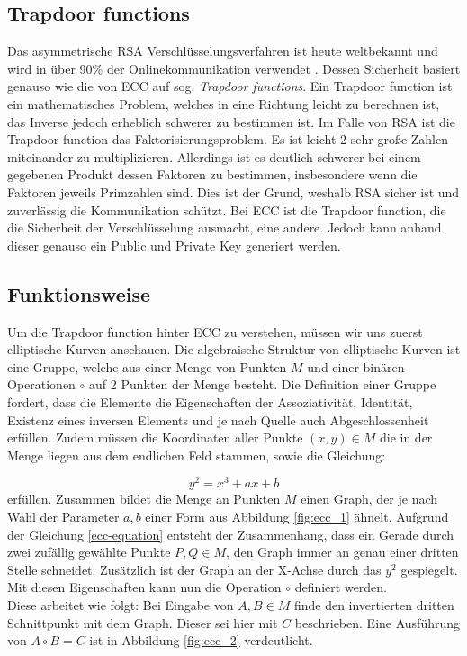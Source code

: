 \documentclass{scrreprt}
\begin{document}
\subsection{Trapdoor functions}
Das asymmetrische RSA Verschlüsselungsverfahren ist heute weltbekannt und wird in über 90\% der Onlinekommunikation verwendet \cite{ecc-rsa_amount}. Dessen Sicherheit basiert genauso wie die von ECC auf sog.  \textit{Trapdoor functions}. Ein Trapdoor function ist ein mathematisches Problem, welches in eine Richtung leicht zu berechnen ist, das Inverse jedoch erheblich schwerer zu bestimmen ist. Im Falle von RSA ist die Trapdoor function das Faktorisierungsproblem. Es ist leicht 2 sehr große Zahlen miteinander zu multiplizieren. Allerdings ist es deutlich schwerer bei einem gegebenen Produkt dessen Faktoren zu bestimmen, insbesondere wenn die Faktoren jeweils Primzahlen sind. Dies ist der Grund, weshalb RSA sicher ist und zuverlässig die Kommunikation schützt. Bei ECC ist die Trapdoor function, die die Sicherheit der Verschlüsselung ausmacht, eine andere. Jedoch kann anhand dieser genauso ein Public und Private Key generiert werden.
\subsection{Funktionsweise}
Um die Trapdoor function hinter ECC zu verstehen, müssen wir uns zuerst elliptische Kurven anschauen. Die algebraische Struktur von elliptische Kurven ist eine Gruppe, welche aus einer Menge von Punkten $M$ und einer binären Operationen $\circ$ auf 2 Punkten der Menge besteht. Die Definition einer Gruppe fordert, dass die Elemente die Eigenschaften der Assoziativität, Identität, Existenz eines inversen Elements und je nach Quelle auch Abgeschlossenheit erfüllen. \cite{ecc-aradi2016einfuhrung}\cite{ecc-bogopolskij2008introduction} Zudem müssen die Koordinaten aller Punkte $(x,y) \in M$ die in der Menge liegen aus dem endlichen Feld stammen, sowie die Gleichung:

\begin{equation}
    \label{ecc-equation}
    y^2 = x^3+ax+b
\end{equation} erfüllen. Zusammen bildet die Menge an Punkten $M$ einen Graph, der je nach Wahl der Parameter $a,b$ einer Form aus Abbildung \ref{fig:ecc_1} ähnelt. Aufgrund der Gleichung \ref{ecc-equation} entsteht der Zusammenhang, dass ein Gerade durch zwei zufällig gewählte Punkte $P,Q \in M$, den Graph immer an genau einer dritten Stelle schneidet. Zusätzlich ist der Graph an der X-Achse durch das $y^2$ gespiegelt. Mit diesen Eigenschaften kann nun die Operation $\circ$ definiert werden.\\
Diese arbeitet wie folgt: Bei Eingabe von $A,B \in M$ finde den invertierten dritten Schnittpunkt mit dem Graph. Dieser sei hier mit $C$ beschrieben. Eine Ausführung von $A \circ B = C$ ist in Abbildung \ref{fig:ecc_2} verdeutlicht.
\end{document}
